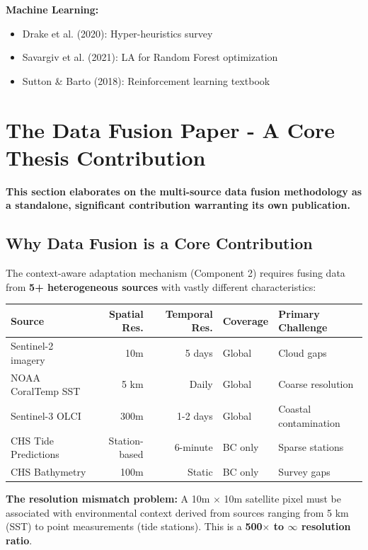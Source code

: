 \documentclass[11pt]{article}
\begin{document}
\textbf{Machine Learning:}
\begin{itemize}
    \item Drake et al. (2020): Hyper-heuristics survey
    \item Savargiv et al. (2021): LA for Random Forest optimization
    \item Sutton \& Barto (2018): Reinforcement learning textbook
\end{itemize}

\section{The Data Fusion Paper - A Core Thesis Contribution}

\textbf{This section elaborates on the multi-source data fusion methodology as a standalone, significant contribution warranting its own publication.}

\subsection{Why Data Fusion is a Core Contribution}

The context-aware adaptation mechanism (Component 2) requires fusing data from \textbf{5+ heterogeneous sources} with vastly different characteristics:

\begin{center}
\begin{tabular}{lrrll}
\toprule
\textbf{Source} & \textbf{Spatial Res.} & \textbf{Temporal Res.} & \textbf{Coverage} & \textbf{Primary Challenge} \\
\midrule
Sentinel-2 imagery & 10m & 5 days & Global & Cloud gaps \\
NOAA CoralTemp SST & 5 km & Daily & Global & Coarse resolution \\
Sentinel-3 OLCI & 300m & 1-2 days & Global & Coastal contamination \\
CHS Tide Predictions & Station-based & 6-minute & BC only & Sparse stations \\
CHS Bathymetry & 100m & Static & BC only & Survey gaps \\
\bottomrule
\end{tabular}
\end{center}

\textbf{The resolution mismatch problem:} A 10m $\times$ 10m satellite pixel must be associated with environmental context derived from sources ranging from 5 km (SST) to point measurements (tide stations). This is a \textbf{500$\times$ to $\infty$ resolution ratio}.
\end{document}
